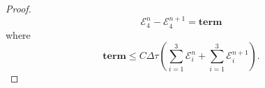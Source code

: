 \documentclass[12pt,reqno]{amsart}
\newcommand{\curl}{{\bf curl}}
\newcommand{\acurl}{\langle a^{-1},{\bf curl_h}\rangle}
\newcommand{\e}{{\bf E}}
\newcommand{\h}{{\bf H}}
\newtheorem{lem}[theorem]{Lemma}
\newtheorem{defi}[theorem]{Definition}
\theoremstyle{definition}
\numberwithin{equation}{section}
\newcommand{\intr}[1]{\mathrm{int}(#1)}
\def\Gw{\Omega}     \def\Gx{\Xi}         \def\Gy{\Psi}
\def\Gwh{\Omega_h}
\begin{document}
\begin{proof}
		$$\mathcal{E}_4^n-
	\mathcal{E}_4^{n+1}=
	\mathbf{term}
		$$
		where 
		$$
		\mathbf{term}\leq C \Delta \tau( \sum_{i=1}^3\mathcal{E}_i^n+
		\sum_{i=1}^3\mathcal{E}_i^{n+1}).
		$$
\end{proof}
%	
%
%
%
%	
%
\end{document}
